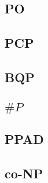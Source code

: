 \documentclass[]{article}
\theoremstyle{definition}
\begin{document}
\subsection{PO}

\subsection{PCP}

\subsection{BQP}

\subsection{$\# P$}

\subsection{PPAD}

\subsection{co-NP}
\end{document}
